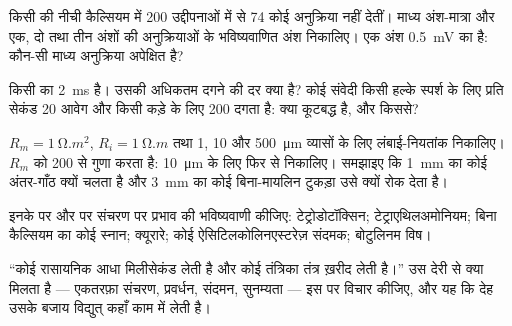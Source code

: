 \begin{exercise}[$\star\star$]\label{exo:b2:neurons-synapses:8}
किसी  की नीची कैल्सियम में 200 उद्दीपनाओं में से 74 कोई
अनुक्रिया नहीं देतीं। माध्य अंश-मात्रा और एक, दो तथा तीन अंशों की
अनुक्रियाओं के भविष्यवाणित अंश निकालिए। एक अंश
\qty{0.5}{mV} का है: कौन-सी माध्य अनुक्रिया अपेक्षित है?
\end{exercise}

\begin{exercise}[$\star\star$]\label{exo:b2:neurons-synapses:9}
किसी  का  \qty{2}{ms} है। उसकी अधिकतम
दगने की दर क्या है? कोई संवेदी  किसी हल्के स्पर्श के लिए प्रति सेकंड 20
आवेग और किसी कड़े के लिए 200 दगता है: क्या कूटबद्ध है, और किससे?
\end{exercise}

\begin{exercise}[$\star\star\star$]\label{exo:b2:neurons-synapses:10}
$R_m = \qty{1}{\ohm.m^2}$, $R_i =
\qty{1}{\ohm.m}$ तथा 1, 10 और \qty{500}{\micro m} व्यासों के लिए
लंबाई-नियतांक निकालिए।  $R_m$ को 200 से गुणा करता है:
\qty{10}{\micro m} के लिए फिर से निकालिए। समझाइए कि \qty{1}{mm} का कोई
अंतर-गाँठ क्यों चलता है और \qty{3}{mm} का कोई बिना-मायलिन टुकड़ा उसे क्यों रोक देता है।
\end{exercise}

\begin{exercise}[$\star\star\star$]\label{exo:b2:neurons-synapses:11}
इनके  पर और  पर संचरण पर
प्रभाव की भविष्यवाणी कीजिए: टेट्रोडोटॉक्सिन; टेट्राएथिलअमोनियम; बिना
कैल्सियम का कोई स्नान; क्यूरारे; कोई ऐसिटिलकोलिनएस्टरेज़ संदमक;
बोटुलिनम विष।
\end{exercise}

\begin{exercise}[$\star\star\star$]\label{exo:b2:neurons-synapses:12}
``कोई रासायनिक  आधा मिलीसेकंड लेती है और कोई तंत्रिका तंत्र
ख़रीद लेती है।'' उस देरी से क्या मिलता है --- एकतरफ़ा संचरण,
प्रवर्धन, संदमन, सुनम्यता --- इस पर विचार कीजिए, और यह कि देह
उसके बजाय विद्युत्  कहाँ काम में लेती है।
\end{exercise}

